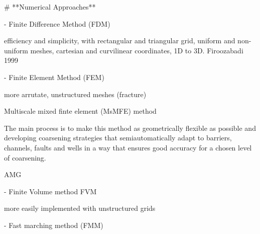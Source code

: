 # **Numerical Approaches**

- Finite Difference Method (FDM)
    
    efficiency and simplicity, with rectangular and triangular grid, uniform and non-uniform meshes, cartesian and curvilinear coordinates, 1D to 3D.  Firoozabadi 1999
    
- Finite Element Method (FEM)
    
    more arrutate, unstructured meshes (fracture)
    
    Multiscale mixed finte element (MsMFE) method 
    
    The main process is to make this method as geometrically flexible as possible and developing coarsening strategies that semiautomatically adapt to barriers, channels, faults and wells in a way that ensures good accuracy for a chosen level of coarsening.
    
    AMG
    
- Finite Volume method FVM
    
    more easily implemented with unstructured grids
    
- Fast marching method (FMM)
